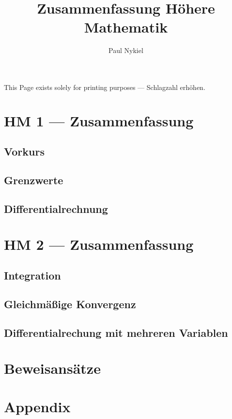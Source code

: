 \documentclass[10pt]{report}
\title{Zusammenfassung Höhere Mathematik}
\author{Paul Nykiel}
\begin{document}
    \maketitle
    \pagebreak
    This Page exists solely for printing purposes --- Schlagzahl erhöhen.
    \pagebreak
    \tableofcontents
    \pagebreak

    \part{HM 1 --- Zusammenfassung}
    \chapter{Vorkurs}
    

    \chapter{Grenzwerte}
    

    \chapter{Differentialrechnung}
    

    \part{HM 2 --- Zusammenfassung}
    \chapter{Integration}
    

    \chapter{Gleichmäßige Konvergenz}
    

    \chapter{Differentialrechung mit mehreren Variablen}
    

    \part{Beweisansätze}
    

    \part{Appendix}
    
\end{document}
